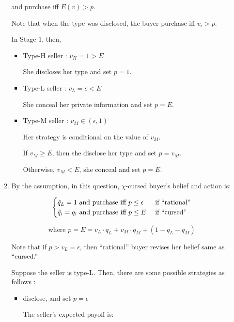 \documentclass{jsarticle}
\begin{document}
\begin{enumerate}
\begin{enumerate}
 and purchase iff $E(v) > p$.
 
 Note that when the type was disclosed, the buyer purchase iff $v_i > p$.
 
 \hspace{2zw} In Stage 1, then, 
 
  \begin{itemize}
  
  \item Type-H seller : $v_H =1 > E $
  
  She discloses her type and set $p = 1$.
  
  \item Type-L seller : $v_L = \epsilon < E$
  
  She conceal her private information and set $p = E$.
  
  \item Type-M seller : $v_M \in (\epsilon, 1)$
  
  Her strategy is conditional on the value of $v_M$.
  
  If $v_M \geq E$, then she disclose her type and set $p = v_M$.
  
  Otherwise, $v_M < E$, she conceal and set $p = E$.
  
  \end{itemize}
 
\vspace{1zw}
 \item By the assumption, in this question, $\chi$-cursed buyer's belief and action is:
 
 \[ \begin{cases}
 \Hat{q}_L = 1 \text{ and purchase iff } p \leq \epsilon & \text{ if ``rational''} \\
 \Hat{q}_i = q_i \text{ and purchase iff } p \leq E & \text{ if ``cursed''}
 \end{cases} \]
   
  \[\text{where } p = E = v_L \cdot q_L + v_M \cdot q_M + (1 - q_L - q_M) \]
   
  Note that if $p > v_L = \epsilon$, then ``rational'' buyer revises her belief same as ``cursed.''
  
  Suppose the seller is type-L. Then, there are some possible strategies as follows :
  
   \begin{itemize}
   
   \item disclose, and set $p = \epsilon$
   
   The seller's expected payoff is:
   

\end{itemize}
\end{enumerate}
\end{enumerate}
\end{document}

